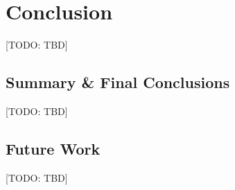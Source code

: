 \chapter{Conclusion}
\label{c:conclusion}
[TODO: TBD]

\section{Summary \& Final Conclusions}
[TODO: TBD]

\section{Future Work}
[TODO: TBD]
